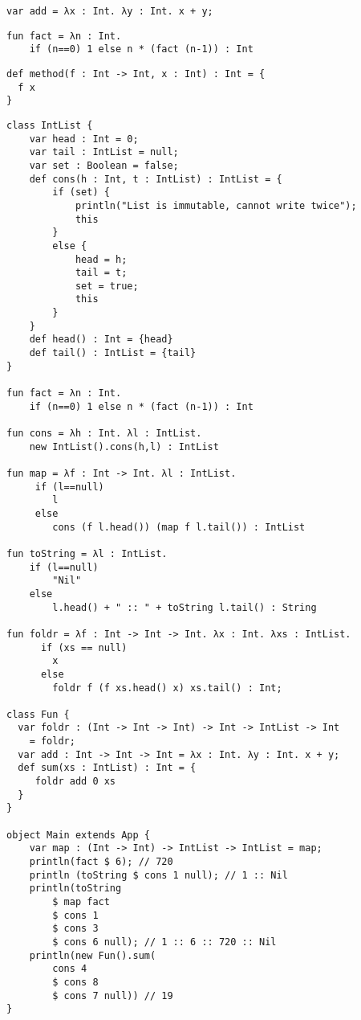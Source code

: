 
\begin{lstlisting}[caption={$\lambda$-expression assigned to variable declaration}]
var add = λx : Int. λy : Int. x + y;
\end{lstlisting}

\begin{lstlisting}[caption=Recursive function declaration computing the factorial of a number $n$,label=factorial]
fun fact = λn : Int.
    if (n==0) 1 else n * (fact (n-1)) : Int
\end{lstlisting}

\begin{lstlisting}[caption={Method taking a function as a parameter}]
def method(f : Int -> Int, x : Int) : Int = {
  f x
}
\end{lstlisting}

\begin{lstlisting}[caption=Program showing multiple features of the $\lambda$-calculus interfacing with classes,label=intlist]
class IntList {
    var head : Int = 0;
    var tail : IntList = null;
    var set : Boolean = false;
    def cons(h : Int, t : IntList) : IntList = {
        if (set) {
            println("List is immutable, cannot write twice");
            this
        }
        else {
            head = h;
            tail = t;
            set = true;
            this
        }
    }
    def head() : Int = {head}
    def tail() : IntList = {tail}
}

fun fact = λn : Int.
    if (n==0) 1 else n * (fact (n-1)) : Int

fun cons = λh : Int. λl : IntList.
    new IntList().cons(h,l) : IntList

fun map = λf : Int -> Int. λl : IntList.
     if (l==null)
        l
     else
        cons (f l.head()) (map f l.tail()) : IntList

fun toString = λl : IntList.
    if (l==null)
        "Nil"
    else
        l.head() + " :: " + toString l.tail() : String

fun foldr = λf : Int -> Int -> Int. λx : Int. λxs : IntList.
      if (xs == null)
        x
      else
        foldr f (f xs.head() x) xs.tail() : Int;

class Fun {
  var foldr : (Int -> Int -> Int) -> Int -> IntList -> Int 
  	= foldr;
  var add : Int -> Int -> Int = λx : Int. λy : Int. x + y;
  def sum(xs : IntList) : Int = {
     foldr add 0 xs
  }
}

object Main extends App {
    var map : (Int -> Int) -> IntList -> IntList = map;
    println(fact $ 6); // 720
    println (toString $ cons 1 null); // 1 :: Nil
    println(toString
    	$ map fact
        $ cons 1
        $ cons 3
        $ cons 6 null); // 1 :: 6 :: 720 :: Nil
    println(new Fun().sum(
    	cons 4
        $ cons 8
        $ cons 7 null)) // 19
}
\end{lstlisting}

